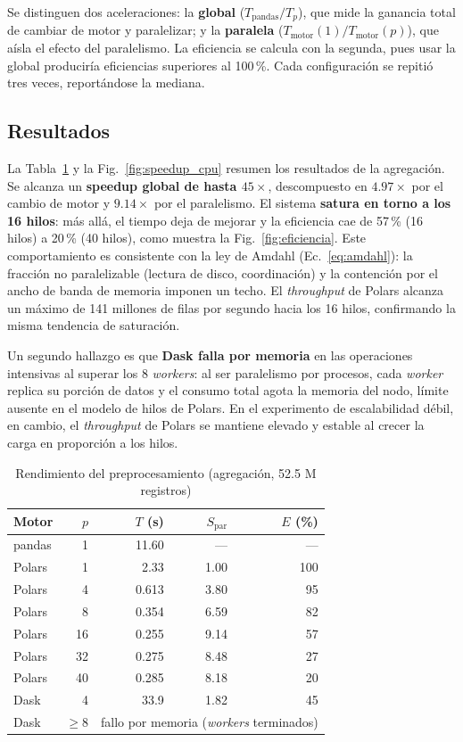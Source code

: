 \documentclass[conference]{IEEEtran}
\begin{document}
Se distinguen dos aceleraciones: la \textbf{global} ($T_{\text{pandas}}/T_p$), que mide la ganancia total de cambiar de motor y paralelizar; y la \textbf{paralela} ($T_{\text{motor}}(1)/T_{\text{motor}}(p)$), que aísla el efecto del paralelismo. La eficiencia se calcula con la segunda, pues usar la global produciría eficiencias superiores al 100\,\%. Cada configuración se repitió tres veces, reportándose la mediana.

\subsection{Resultados}
La Tabla~\ref{tab:bench_cpu} y la Fig.~\ref{fig:speedup_cpu} resumen los resultados de la agregación. Se alcanza un \textbf{speedup global de hasta $45\times$}, descompuesto en $4.97\times$ por el cambio de motor y $9.14\times$ por el paralelismo. El sistema \textbf{satura en torno a los 16 hilos}: más allá, el tiempo deja de mejorar y la eficiencia cae de 57\,\% (16 hilos) a 20\,\% (40 hilos), como muestra la Fig.~\ref{fig:eficiencia}. Este comportamiento es consistente con la ley de Amdahl (Ec.~\ref{eq:amdahl}): la fracción no paralelizable (lectura de disco, coordinación) y la contención por el ancho de banda de memoria imponen un techo. El \textit{throughput} de Polars alcanza un máximo de 141 millones de filas por segundo hacia los 16 hilos, confirmando la misma tendencia de saturación.

Un segundo hallazgo es que \textbf{Dask falla por memoria} en las operaciones intensivas al superar los 8 \textit{workers}: al ser paralelismo por procesos, cada \textit{worker} replica su porción de datos y el consumo total agota la memoria del nodo, límite ausente en el modelo de hilos de Polars. En el experimento de escalabilidad débil, en cambio, el \textit{throughput} de Polars se mantiene elevado y estable al crecer la carga en proporción a los hilos.

\begin{table}[tb]
\caption{Rendimiento del preprocesamiento (agregación, 52.5 M registros)}
\label{tab:bench_cpu}
\centering
\renewcommand{\arraystretch}{1.2}
\begin{tabular}{l r r r r}
\toprule
\textbf{Motor} & \textbf{$p$} & \textbf{$T$ (s)} & \textbf{$S_{\text{par}}$} & \textbf{$E$ (\%)} \\
\midrule
pandas & 1  & 11.60 & ---  & --- \\
Polars & 1  & 2.33  & 1.00 & 100 \\
Polars & 4  & 0.613 & 3.80 & 95 \\
Polars & 8  & 0.354 & 6.59 & 82 \\
Polars & 16 & 0.255 & 9.14 & 57 \\
Polars & 32 & 0.275 & 8.48 & 27 \\
Polars & 40 & 0.285 & 8.18 & 20 \\
Dask   & 4  & 33.9  & 1.82 & 45 \\
Dask   & $\geq 8$ & \multicolumn{3}{c}{fallo por memoria (\textit{workers} terminados)} \\
\bottomrule
\end{tabular}
\end{table}
\end{document}

